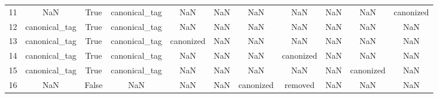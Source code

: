 \begin{table}[h!]
{\begin{tabular}{|c|c|c|c|c|c|c|c|c|c|c|}
         11 &                       NaN &                              True &                canonical\_tag &                                  NaN &                                  NaN &                                  NaN &                                  NaN &                                  NaN &                                  NaN &                                          canonized \\
         12 &             canonical\_tag &                              True &                canonical\_tag &                                  NaN &                                  NaN &                                  NaN &                                  NaN &                                  NaN &                                  NaN &                                                NaN \\
         13 &             canonical\_tag &                              True &                canonical\_tag &                            canonized &                                  NaN &                                  NaN &                                  NaN &                                  NaN &                                  NaN &                                                NaN \\
         14 &             canonical\_tag &                              True &                canonical\_tag &                                  NaN &                                  NaN &                                  NaN &                            canonized &                                  NaN &                                  NaN &                                                NaN \\
         15 &             canonical\_tag &                              True &                canonical\_tag &                                  NaN &                                  NaN &                                  NaN &                                  NaN &                                  NaN &                            canonized &                                                NaN \\
         16 &                       NaN &                             False &                          NaN &                                  NaN &                                  NaN &                            canonized &                              removed &                                  NaN &                                  NaN &                                                NaN \\

\end{tabular}}
\end{table}
